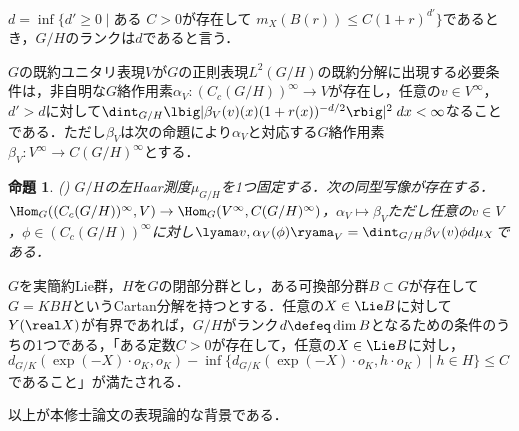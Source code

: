 \documentclass[12pt,dvipdfmx,uplatex]{jsarticle}
\newcounter{countabst}
\newtheorem{prop-a}[countabst]{命題}
\begin{document}
$d = \inf\{d'\geq 0\mid \text{ある } C > 0\text{が存在して }  m_X(B(r))\leq C(1+r)^{d'}\} $であるとき，$G/H$のランクは$d$であると言う．

$G$の既約ユニタリ表現$V$が$G$の正則表現$L^2(G/H)$の既約分解に出現する必要条件は，非自明な$G$絡作用素$\alpha_V\colon (C_c(G/H))^{\infty}\to V $が存在し，任意の$v\in V^{\infty} $，$d' > d$に対して$\dint_{G/H}\lbig|\beta_V(v)(x)(1+r(x))^{-d/2} \rbig|^2\; dx < \infty $なることである．ただし$\beta_V $は次の命題により$\alpha_V $と対応する$G$絡作用素$\beta_V\colon V^{\infty}\to C(G/H)^{\infty}  $とする．
\begin{prop-a}(\cite[p.~678]{ber88})
  $G/H$の左Haar測度$\mu_{G/H} $を1つ固定する．次の同型写像が存在する．$\Hom_{G}((C_c(G/H))^{\infty}, V )\to \Hom_{G}(V^{\infty}, C(G/H)^{\infty}) $，$\alpha_V\mapsto \beta_V$ただし任意の$v\in V$，$\phi \in  (C_c(G/H))^{\infty} $に対し$ \lyama v,\alpha_V(\phi)\ryama_{V} = \dint_{G/H}\beta_V(v)\phi d\mu_X  $である．
\end{prop-a}

$G$を実簡約Lie群，$H$を$G$の閉部分群とし，ある可換部分群$B\subset G$が存在して$G = KBH $というCartan分解を持つとする．任意の$X\in \Lie B$に対して$Y(\real X) $が有界であれば，$G/H$がランク$d \defeq \dim B $となるための条件のうちの1つである，「ある定数$C > 0$が存在して，任意の$X\in \Lie B$に対し，$d_{G/K}(\exp(-X)\cdot o_K, o_K )  - \inf\{d_{G/K}(\exp(-X)\cdot o_K,h\cdot o_K ) \mid h\in H\}\leq C$であること」が満たされる．

以上が本修士論文の表現論的な背景である．
\end{document}
